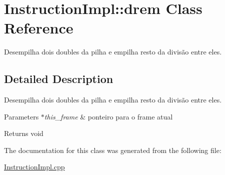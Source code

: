 \hypertarget{class_instruction_impl_1_1drem}{}\section{Instruction\+Impl\+:\+:drem Class Reference}
\label{class_instruction_impl_1_1drem}


Desempilha dois doubles da pilha e empilha resto da divisão entre eles.  




\subsection{Detailed Description}
Desempilha dois doubles da pilha e empilha resto da divisão entre eles. 


\begin{DoxyParams}{Parameters}
{\em $\ast$this\+\_\+frame} & ponteiro para o frame atual \\
\hline
\end{DoxyParams}
\begin{DoxyReturn}{Returns}
void 
\end{DoxyReturn}


The documentation for this class was generated from the following file\+:\begin{DoxyCompactItemize}
\item 
\hyperlink{_instruction_impl_8cpp}{Instruction\+Impl.\+cpp}\end{DoxyCompactItemize}
